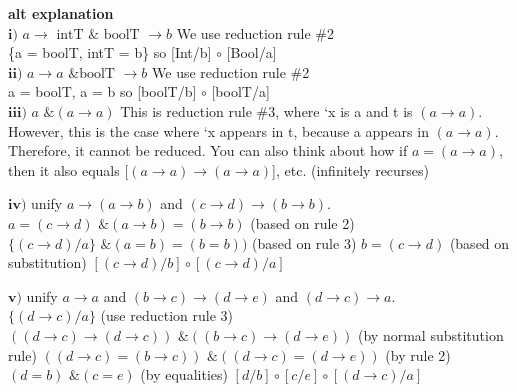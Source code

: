 \documentclass[letterpaper, 8pt]{extarticle}
\begin{document}
\begin{multicols*}{4}
    \textbf{alt explanation} \\
    $\textbf{i)}$ $a \to \text{ intT } \& \text{ boolT } \to b$
    We use reduction rule \#2\\
    \{a = boolT, intT = b\}  so [Int/b] $\circ$ [Bool/a]\\
    $\textbf{ii)}$  $a \to  a \text{ \& boolT } \to  b$
    We use reduction rule \#2\\
    {a = boolT, a  = b}   so  [boolT/b] $\circ$ [boolT/a]\\
    $\textbf{iii)}$ $a \text{ \& } (a \to a)$
    This is reduction rule \#3, where ‘x is a and t is $(a \to a)$. However, this is the case where
    ‘x appears in t, because a appears in $(a \to a)$.
    Therefore, it cannot be reduced. You can also think about how if $a = (a \to a)$,
    then it also equals [$(a \to a) \to (a \to a)$], etc. (infinitely recurses)

    $\textbf{iv)}$ unify $a \to (a \to b)$ and $(c \to d) \to (b \to b)$.
    $a = (c \to d)   \text{ \& }  (a \to b) = (b \to b)$ (based on rule 2)
    $\{(c \to d)/a\} \text{ \& }  (a=b) = (b=b))$ (based on rule 3)
    $b = (c \to d)$  (based on substitution)
    $[(c \to d)/b] \circ [(c \to d)/a]$

    $\textbf{v)}$ unify $a \to a$ and $(b \to c) \to (d \to e)$ and $(d \to c) \to a$.\\
    $\{(d \to c) / a\}$  (use reduction rule 3)
    $((d \to c) \to (d \to c)) \text{ \& } ((b \to c) \to (d \to e))$  (by normal substitution rule)
    $((d \to c) = (b \to c)) \text{ \& } ((d \to c) = (d \to e))$  (by rule 2)
    $(d=b) \text{ \& } (c=e)$ (by equalities)
    $[d/b] \circ [c/e] \circ [(d \to c)/a]$


\end{multicols*}
\end{document}
